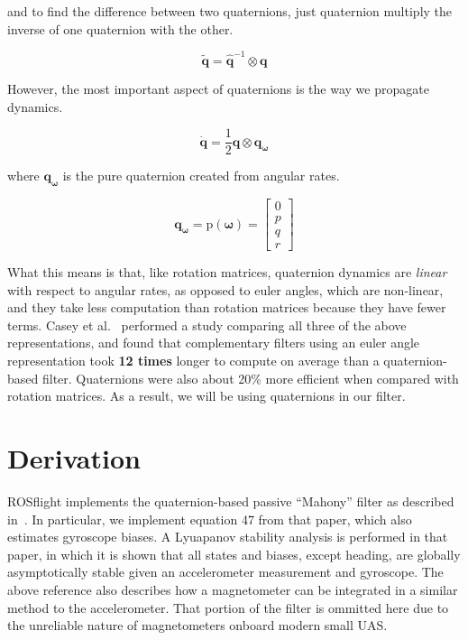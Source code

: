 \documentclass[paper=a4, fontsize=11pt]{scrartcl} %
\numberwithin{equation}{section} %
\numberwithin{figure}{section} %
\numberwithin{table}{section} %
\begin{document}
and to find the difference between two quaternions, just quaternion multiply the inverse of one quaternion with the other.

\begin{equation}
	\tilde{\bm{q}} = \hat{\bm{q}}^{-1} \otimes \bm{q}
\end{equation}

However, the most important aspect of quaternions is the way we propagate dynamics.

\begin{equation}
	\dot{\bm{q}} = \frac{1}{2} \bm{q} \otimes \bm{q_{\omega}}
\end{equation}

where $\bm{q_{\omega}}$ is the pure quaternion created from angular rates.

\begin{equation}
	\bm{q_{\omega}} = \textrm{p}(\bm{\omega}) =
			  \begin{bmatrix}
				0 \\
				p \\
				q \\
				r 
			 \end{bmatrix} 
\end{equation}

What this means is that, like rotation matrices, quaternion dynamics are \textit{linear} with respect to angular rates, as opposed to euler angles, which are non-linear, and they take less computation than rotation matrices because they have fewer terms.  Casey et al.~\cite{Casey2013} performed a study comparing all three of the above representations, and found that complementary filters using an euler angle representation took \textbf{12 times} longer to compute on average than a quaternion-based filter.  Quaternions were also about 20\% more efficient when compared with rotation matrices.  As a result, we will be using quaternions in our filter.

\section{Derivation}

ROSflight implements the quaternion-based passive ``Mahony'' filter as described in~\cite{Mahony2007}.  In particular, we implement equation 47 from that paper, which also estimates gyroscope biases.  A Lyuapanov stability analysis is performed in that paper, in which it is shown that all states and biases, except heading, are globally asymptotically stable given an accelerometer measurement and gyroscope.  The above reference also describes how a magnetometer can be integrated in a similar method to the accelerometer.  That portion of the filter is ommitted here due to the unreliable nature of magnetometers onboard modern small UAS.
\end{document}
